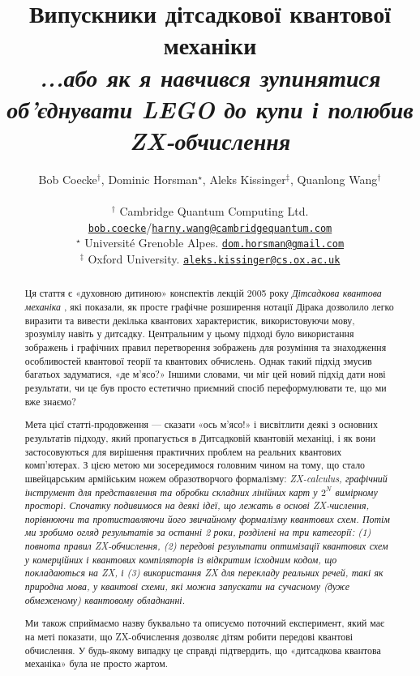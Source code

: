 \documentclass[11pt]{article}
\title{Випускники дітсадкової квантової механіки\vspace{2mm}
\\ \large\it ...або як я навчився зупинятися об'єднувати LEGO до купи і полюбив ZX-обчислення}
\author{Bob Coecke${}^\dagger$, Dominic Horsman${}^\star$, Aleks Kissinger${}^\ddagger$, Quanlong Wang${}^\dagger$\\
\ \\ 
${}^\dagger$ Cambridge Quantum Computing Ltd. \\ \href{mailto:bob.coecke@cambridgequantum.com}{\tt bob.coecke}/\href{mailto:harny.wang@cambridgequantum.com}{\tt harny.wang@cambridgequantum.com} \\
${}^\star$ Universit\'e Grenoble Alpes. \href{mailto:dom.horsman@gmail.com}{\tt dom.horsman@gmail.com}\\
${}^\ddagger$ Oxford University. \href{mailto:aleks.kissinger@cs.ox.ac.uk}{\tt aleks.kissinger@cs.ox.ac.uk}
}
\theoremstyle{definition}
\def\bR{\begin{color}{red}}
\def\e{\end{color}\xspace}
\newcommand{\TODOb}[1]{\marginpar{\scriptsize\bR \textbf{TODO:} #1\e}}
\begin{document}
  
\maketitle 

\begin{abstract} 
Ця стаття є «духовною дитиною» конспектів лекцій 2005 року \textit{Дітсадкова квантова механіка} \cite{Kindergarten}, які показали, як просте графічне розширення нотації Дірака дозволило легко виразити та вивести декілька квантових характеристик, використовуючи мову, зрозумілу навіть у дитсадку. Центральним у цьому підході було використання зображень і графічних правил перетворення зображень для розуміння та знаходження особливостей квантової теорії та квантових обчислень. Однак такий підхід змусив багатьох задуматися, «де м'ясо?» Іншими словами, чи міг цей новий підхід дати нові результати, чи це був просто естетично приємний спосіб переформулювати те, що ми вже знаємо?

Мета цієї статті-продовження — сказати «ось м'ясо!» і висвітлити деякі з основних результатів підходу, який пропагується в Дитсадковій квантовій механіці, і як вони застосовуються для вирішення практичних проблем на реальних квантових комп’ютерах. З цією метою ми зосередимося головним чином на тому, що стало швейцарським армійським ножем образотворчого формалізму: \em ZX-calculus\em, графічний інструмент для представлення та обробки складних лінійних карт у $2^N$ вимірному просторі. Спочатку подивимося
на деякі ідеї, що лежать в основі ZX-числення, порівнюючи та протиставляючи його звичайному формалізму квантових схем.
Потім ми зробимо огляд результатів за останні 2 роки, розділені на три категорії:
(1) повнота правил ZX-обчислення, (2) передові результати оптимізації квантових схем у комерційних і квантових компіляторів із відкритим ісходним кодом, що покладаються на ZX, і (3) використання ZX для перекладу реальних речей, такі як природна мова, у квантові схеми, які можна запускати на сучасному (дуже обмеженому) квантовому обладнанні.

Ми також сприймаємо назву буквально та описуємо поточний експеримент, який має на меті показати, що ZX-обчислення дозволяє дітям робити передові квантові обчислення. У будь-якому випадку це справді підтвердить, що «дитсадкова квантова механіка» була не просто жартом.
\end{abstract}
\end{document}
